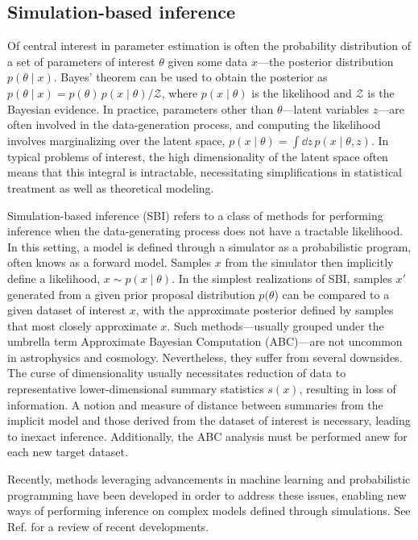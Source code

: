 \documentclass[prd,aps,10pt,nofootinbib,twocolumn,superscriptaddress,preprintnumbers,balancelastpage,longbibliography]{revtex4-1}
\begin{document}
\subsection{Simulation-based inference}

Of central interest in parameter estimation is often the probability distribution of a set of parameters of interest $\theta$ given some data $x$---the posterior distribution $p(\theta\mid x)$. Bayes' theorem can be used to obtain the posterior as $p(\theta\mid x) = p(\theta)\, p(x\mid\theta) / \mathcal Z$, where $p(x\mid\theta)$ is the likelihood and $\mathcal Z$ is the Bayesian evidence. In practice, parameters other than $\theta$---latent variables $z$---are often involved in the data-generation process, and computing the likelihood involves marginalizing over the latent space, $p(x\mid\theta) = \int \dd z\,p(x\mid\theta, z)$. In typical problems of interest, the high dimensionality of the latent space often means that this integral is intractable, necessitating simplifications in statistical treatment as well as theoretical modeling. 


Simulation-based inference (SBI) refers to a class of methods for performing inference when the data-generating process does not have a tractable likelihood. In this setting, a model is defined through a simulator as a probabilistic program, often knows as a forward model. Samples $x$ from the simulator then implicitly define a likelihood, $x\sim p(x\mid\theta)$. In the simplest realizations of SBI, samples $x'$ generated from a given prior proposal distribution $p(\theta$) can be compared to a given dataset of interest $x$, with the approximate posterior defined by samples that most closely approximate $x$. Such methods---usually grouped under the umbrella term Approximate Bayesian Computation (ABC)---are not uncommon in astrophysics and cosmology. Nevertheless, they suffer from several downsides. The curse of dimensionality usually necessitates reduction of data to representative lower-dimensional summary statistics $s(x)$, resulting in loss of information. A notion and measure of distance between summaries from the implicit model and those derived from the dataset of interest is necessary, leading to inexact inference. Additionally, the ABC analysis must be performed anew for each new target dataset.

Recently, methods leveraging advancements in machine learning and probabilistic programming have been developed in order to address these issues, enabling new ways of performing inference on complex models defined through simulations. See Ref. for a review of recent developments.
\end{document}
